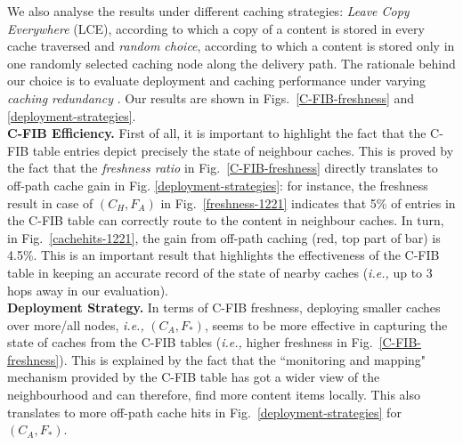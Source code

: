 \documentclass{sig-alternate}
\newcommand{\ie}{{\em i.e.,\/ }}
\begin{document}
We also analyse the results under different caching strategies: \textit{Leave Copy Everywhere} (LCE), according to which a copy of a content is stored in every cache traversed and \textit{random choice}, according to which a content is stored only in one randomly selected caching node along the delivery path.
The rationale behind our choice is to evaluate deployment and caching performance under varying \textit{caching redundancy} \cite{probcache-tpds}. Our results are shown in Figs.~\ref{C-FIB-freshness} and \ref{deployment-strategies}.
\\[0.2cm]
\textbf{C-FIB Efficiency.} First of all, it is important to highlight the fact that the C-FIB table entries depict precisely the state of neighbour caches. This is proved by the fact that the \textit{freshness ratio} in Fig.~\ref{C-FIB-freshness} directly translates to off-path cache gain in Fig. \ref{deployment-strategies}: for instance, the freshness result in case of $\left(C_{H}, F_{A} \right)$ in Fig.~\ref{freshness-1221} indicates that 5\% of entries in the C-FIB table can correctly route to the content in neighbour caches. In turn, in Fig.~\ref{cachehits-1221}, the gain from off-path caching (red, top part of bar) is 4.5\%. This is an important result that highlights the effectiveness of the C-FIB table in keeping an accurate record of the state of nearby caches (\ie up to 3 hops away in our evaluation).
\\[0.2cm]
\textbf{Deployment Strategy.} In terms of C-FIB freshness, deploying smaller caches over more/all nodes, \ie $\left(C_{A}, F_{*} \right)$, seems to be more effective in capturing the state of caches from the C-FIB tables (\ie higher freshness in Fig.~\ref{C-FIB-freshness}). This is explained by the fact that the ``monitoring and mapping" mechanism provided by the C-FIB table has got a wider view of the neighbourhood and can therefore, find more content items locally. This also translates to more off-path cache hits in Fig.~\ref{deployment-strategies} for $\left(C_{A}, F_{*} \right)$.
\end{document}
